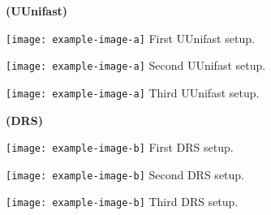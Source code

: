 \documentclass[]{article}
\begin{document}
	\begin{minipage}[t]{0.48\linewidth}
		\centering
		\textbf{(UUnifast)}
		\vspace{0.3cm}
		
		\texttt{[image: example-image-a]}
		First UUnifast setup.
		\vspace{0.3cm}
		
		\texttt{[image: example-image-a]}
		Second UUnifast setup.
		\vspace{0.3cm}
		
		\texttt{[image: example-image-a]}
		Third UUnifast setup.
		\vspace{0.3cm}
		
		
	\end{minipage}\hfill
	\begin{minipage}[t]{0.48\linewidth}
		\centering
		\textbf{(DRS)}
		\vspace{0.3cm}
		
		\texttt{[image: example-image-b]}
		First DRS setup.
		\vspace{0.3cm}
		
		\texttt{[image: example-image-b]}
		Second DRS setup.
		\vspace{0.3cm}
		
		\texttt{[image: example-image-b]}
		Third DRS setup.
		\vspace{0.3cm}
	\end{minipage}

	
	
\end{document}
